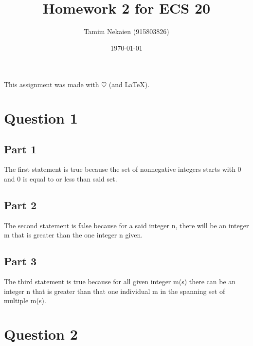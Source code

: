 \documentclass[a4paper,12pt]{article}
\begin{document}
\title{Homework 2 for ECS 20}
\author{Tamim Nekaien (915803826)}
\date{\today}
\maketitle

This assignment was made with 
$\heartsuit$ (and \LaTeX).

\tableofcontents
\newpage
 
\section{Question 1}
\label{sec1}


\subsection{Part 1}
\label{sec2}
The first statement is true because the set of nonnegative integers starts with 0 and 0 is equal to or less than said set.
\subsection{Part 2}
\label{sec3}
The second statement is false because for a said integer n, there will be an integer m that is greater than the one integer n given.
\subsection{Part 3}
\label{sec4}
The third statement is true because for all given integer m(s) there can be an integer n that is greater than that one individual m in the spanning set of multiple m(s).

\section{Question 2}
\label{sec5}
\end{document}
